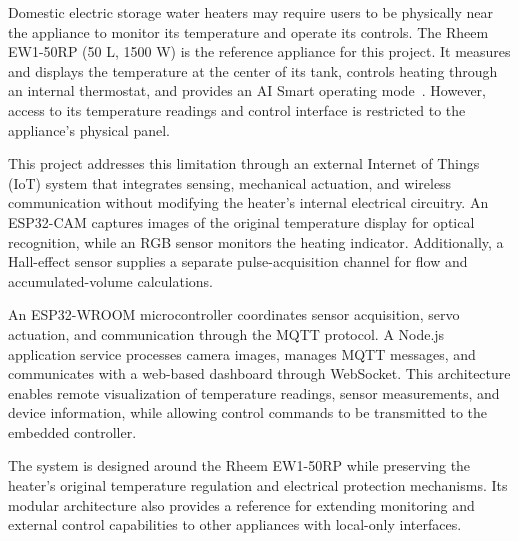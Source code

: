 Domestic electric storage water heaters may require users to be physically near the appliance to monitor its temperature and
operate its controls. 
The Rheem EW1-50RP (50 L, 1500 W) is the reference appliance for this project.
It measures and displays the temperature at the center of its tank, controls heating through an internal thermostat,
and provides an AI Smart operating mode~\cite{rheemmanual}.
However, access to its temperature readings and control interface is restricted to the appliance's physical panel.

This project addresses this limitation through an external Internet of Things (IoT) system that integrates sensing,
mechanical actuation, and wireless communication without modifying the heater's internal electrical circuitry.
An ESP32-CAM captures images of the original temperature display for optical recognition, while an RGB sensor monitors the heating indicator.
Additionally, a Hall-effect sensor supplies a separate pulse-acquisition channel for flow and accumulated-volume calculations.

An ESP32-WROOM microcontroller coordinates sensor acquisition, servo actuation, and communication through the MQTT protocol.
A Node.js application service processes camera images, manages MQTT messages, and communicates with a web-based dashboard
through WebSocket. This architecture enables remote visualization of temperature readings, sensor measurements, and device information,
while allowing control commands to be transmitted to the embedded controller.

The system is designed around the Rheem EW1-50RP while preserving the heater's original temperature regulation and
electrical protection mechanisms.
Its modular architecture also provides a reference for extending monitoring and external control capabilities to other
appliances with local-only interfaces.

